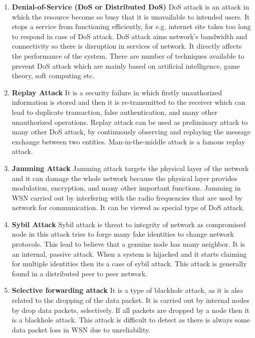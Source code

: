 \begin{enumerate}[label=\textbf{\roman*.}]
    \item \textbf{Denial-of-Service (DoS or Distributed DoS) }\cite{patil2016attack} DoS attack is an attack in which the resource become so busy that it is unavailable to intended users. It stops a service from functioning efficiently, for e.g. internet site takes too long to respond in case of DoS attack. DoS attack aims  network’s bandwidth and connectivity so there is disruption in services of network. It directly affects the performance of the system. There are number of techniques available to prevent DoS attack which are mainly based on artificial intelligence, game theory, soft computing etc.
    \item \textbf{Replay Attack }\cite{sharma2017mitigating}
    It is a security failure in which firstly unauthorized information is stored and then it is re-transmitted to the receiver which can lead to duplicate transaction, false authentication, and many other unauthorized operations. Replay attack can be used as preliminary attack to many other DoS attack, by continuously observing and replaying the message exchange between two entities. Man-in-the-middle attack is a famous replay attack.

    \item \textbf{Jamming Attack }\cite{mpitziopoulos2009survey} Jamming attack targets the physical layer of the network and it can damage the whole network because the physical layer provides modulation, encryption, and many other important functions. Jamming in WSN carried out by interfering with the radio frequencies that are used by network for communication. It can be viewed as special type of DoS attack.
    
    \item \textbf{Sybil Attack }\cite{ssu2009detecting} Sybil attack is threat to integrity of network as compromised node in this attack tries to forge many fake identities to change network protocols. This lead to believe that a genuine node has many neighbor. It is an internal, passive attack. When a system is hijacked and it starts claiming for multiple identities then its a case of sybil attack. This attack is generally found in a distributed peer to peer network. 
    
    \item \textbf{Selective forwarding attack }\cite{bysani2011survey} It is a type of blackhole attack, as it is also related to the dropping of the data packet. It is carried out by internal nodes by drop data packets, selectively. If all packets are dropped by a node then it is a blackhole attack. This attack is difficult to detect as there is always some data packet loss in WSN due to unreliability.
    

\end{enumerate}
